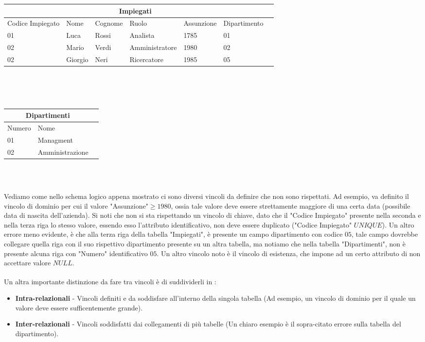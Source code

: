 \documentclass[12pt, letterpaper]{article}
\begin{document}
\begin{tabular}{|l|l|l|l|l|l|r|}
    \hline
\multicolumn{6}{|c|}{\textbf{Impiegati}}\\
\hline
Codice Impiegato & Nome & Cognome & Ruolo & Assunzione & Dipartimento\\
\hline
01 & Luca & Rossi & Analista & \color{red}1785 & 01 \\
\hline
\color{red}02 & Mario & Verdi & Amministratore & 1980 & 02 \\
\hline
\color{red}02 & Giorgio & Neri & Ricercatore & 1985 & \color{red}05 \\
\hline
\end{tabular}\\\hphantom{.}\\\hphantom{.}\\
\begin{tabular}{|l|l|r|}
    \hline
\multicolumn{2}{|c|}{\textbf{Dipartimenti}}\\
\hline
Numero & Nome \\
\hline
01 & Managment \\
\hline
02 & Amministrazione \\
\hline
\end{tabular}\\
 \hphantom{.}\\
 \raggedright
Vediamo come nello schema logico appena mostrato ci sono diversi vincoli da definire che non sono rispettati.
Ad esempio, va definito il vincolo di dominio per cui il valore "Assunzione"\(\ge1980\), ossia tale valore deve essere
strettamente maggiore di una certa data (possibile data di nascita dell'azienda). Si noti che non si sta rispettando
un vincolo di chiave, dato che il "Codice Impiegato" presente nella seconda e nella terza riga lo stesso valore, essendo
esso l'attributo identificativo, non deve essere duplicato ("Codice Impiegato" \(UNIQUE\)). Un altro errore meno evidente, è che
alla terza riga della tabella "Impiegati", è presente un campo dipartimento con codice \(05\), tale campo dovrebbe
collegare quella riga con il suo rispettivo dipartimento presente su un altra tabella, ma notiamo che nella tabella "Dipartimenti", 
non è presente alcuna riga con "Numero" identificativo \(05\). Un altro vincolo noto è il vincolo di esistenza, che impone ad un certo
attributo di non accettare valore \(NULL\).\\\hphantom{.}\\
Un altra importante distinzione da fare tra vincoli è di suddividerli in :
\begin{itemize}
    \item \textbf{Intra-relazionali} - Vincoli definiti e da soddisfare all'interno della singola tabella (Ad esempio, un vincolo di dominio 
    per il quale un valore deve essere sufficentemente grande).
    \item \textbf{Inter-relazionali} - Vincoli soddisfatti dai collegamenti di più tabelle (Un chiaro esempio è il sopra-citato errore sulla tabella del 
    dipartimento).
\end{itemize}
\end{document}
